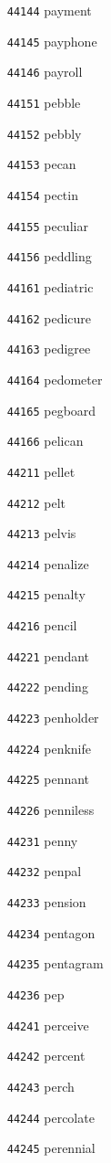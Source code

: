 \documentclass[twoside,11pt]{article}
\begin{document}
\begin{multicols}{5}
\begin{enumerate}
\item[\texttt{44144}] payment
\item[\texttt{44145}] payphone
\item[\texttt{44146}] payroll
\item[\texttt{44151}] pebble
\item[\texttt{44152}] pebbly
\item[\texttt{44153}] pecan
\item[\texttt{44154}] pectin
\item[\texttt{44155}] peculiar
\item[\texttt{44156}] peddling
\item[\texttt{44161}] pediatric
\item[\texttt{44162}] pedicure
\item[\texttt{44163}] pedigree
\item[\texttt{44164}] pedometer
\item[\texttt{44165}] pegboard
\item[\texttt{44166}] pelican
\item[\texttt{44211}] pellet
\item[\texttt{44212}] pelt
\item[\texttt{44213}] pelvis
\item[\texttt{44214}] penalize
\item[\texttt{44215}] penalty
\item[\texttt{44216}] pencil
\item[\texttt{44221}] pendant
\item[\texttt{44222}] pending
\item[\texttt{44223}] penholder
\item[\texttt{44224}] penknife
\item[\texttt{44225}] pennant
\item[\texttt{44226}] penniless
\item[\texttt{44231}] penny
\item[\texttt{44232}] penpal
\item[\texttt{44233}] pension
\item[\texttt{44234}] pentagon
\item[\texttt{44235}] pentagram
\item[\texttt{44236}] pep
\item[\texttt{44241}] perceive
\item[\texttt{44242}] percent
\item[\texttt{44243}] perch
\item[\texttt{44244}] percolate
\item[\texttt{44245}] perennial

\end{enumerate}
\end{multicols}
\end{document}
